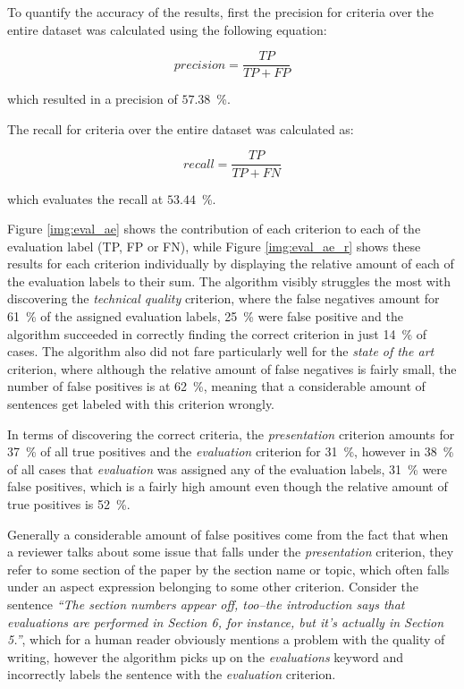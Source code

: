 To quantify the accuracy of the results, first the precision for criteria over the entire dataset was calculated using the following equation:

\begin{equation}
precision = \frac{TP}{TP + FP}
\end{equation}

which resulted in a precision of $57.38$~\%. 

The recall for criteria over the entire dataset was calculated as:

\begin{equation}
recall = \frac{TP}{TP + FN}
\end{equation}

which evaluates the recall at $53.44$~\%.


Figure \ref{img:eval_ae} shows the contribution of each criterion to each of the evaluation label (TP, FP or FN), while Figure \ref{img:eval_ae_r} shows these results for each criterion individually by displaying the relative amount of each of the evaluation labels to their sum. The algorithm visibly struggles the most with discovering the \textit{technical quality} criterion, where the false negatives amount for 61~\% of the assigned evaluation labels, 25~\% were false positive and the algorithm succeeded in correctly finding the correct criterion in just 14~\% of cases. The algorithm also did not fare particularly well for the \textit{state of the art} criterion, where although the relative amount of false negatives is fairly small, the number of false positives is at 62~\%, meaning that a considerable amount of sentences get labeled with this criterion wrongly. 

 In terms of discovering the correct criteria, the \textit{presentation} criterion amounts for 37~\% of all true positives and the \textit{evaluation} criterion for 31~\%, however in 38~\% of all cases that \textit{evaluation} was assigned any of the evaluation labels, 31~\% were false positives, which is a fairly high amount even though the relative amount of true positives is 52~\%. 

Generally a considerable amount of false positives come from the fact that when a reviewer talks about some issue that falls under the \textit{presentation} criterion, they refer to some section of the paper by the section name or topic, which often falls under an aspect expression belonging to some other criterion. Consider the sentence \textit{``The section numbers appear off, too--the introduction says that evaluations are performed in Section 6, for instance, but it's actually in Section 5.''}, which for a human reader obviously mentions a problem with the quality of writing, however the algorithm picks up on the \textit{evaluations} keyword and incorrectly labels the sentence with the \textit{evaluation} criterion.  

